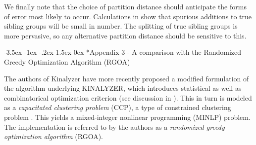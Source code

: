\documentclass[twoside,10pt,twocolumn]{article}
\makeatletter
\renewcommand\section{\@startsection {section}{1}{\z@}%
                                   {-3.5ex \@plus -1ex \@minus -.2ex}%
                                   {1.5ex \@plus 0ex}%
                                   {\normalfont\normalsize\bfseries}}
\makeatother
\begin{document}
 
We finally note that the choice of partition distance should anticipate the forms of error most likely to 
occur. Calculations in \citet{almudevar99} show that spurious additions to true sibling groups will be small 
in number. The splitting of true sibling groups is more pervasive, so any alternative partition distance 
should be sensitive to this.    

\section*{Appendix 3 - A comparison with the Randomized Greedy Optimization Algorithm (RGOA)} 

The authors of Kinalyzer have more recently proposed a modified formulation of the algorithm underlying 
KINALYZER, which introduces statistical as well as combinatorical optimization criterion (see discussion in 
\cite{alm&and11}). This in turn is modeled as a \emph{capacitated clustering problem} (CCP), a type of 
constrained clustering problem \cite{Chou2012}. This yields a mixed-integer nonlinear programming (MINLP) 
problem. The implementation is referred to by the authors as a  \emph{randomized greedy optimization 
algorithm} (RGOA). 
\end{document}
